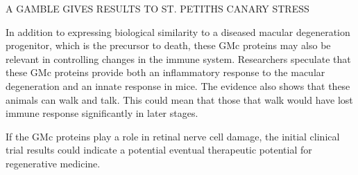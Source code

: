 \documentclass{article}
\begin{document}
A GAMBLE GIVES RESULTS TO ST. PETITHS CANARY STRESS

In addition to expressing biological similarity to a diseased macular degeneration progenitor, which is the precursor to death, these GMc proteins may also be relevant in controlling changes in the immune system. Researchers speculate that these GMc proteins provide both an inflammatory response to the macular degeneration and an innate response in mice. The evidence also shows that these animals can walk and talk. This could mean that those that walk would have lost immune response significantly in later stages.

If the GMc proteins play a role in retinal nerve cell damage, the initial clinical trial results could indicate a potential eventual therapeutic potential for regenerative medicine.
\end{document}
